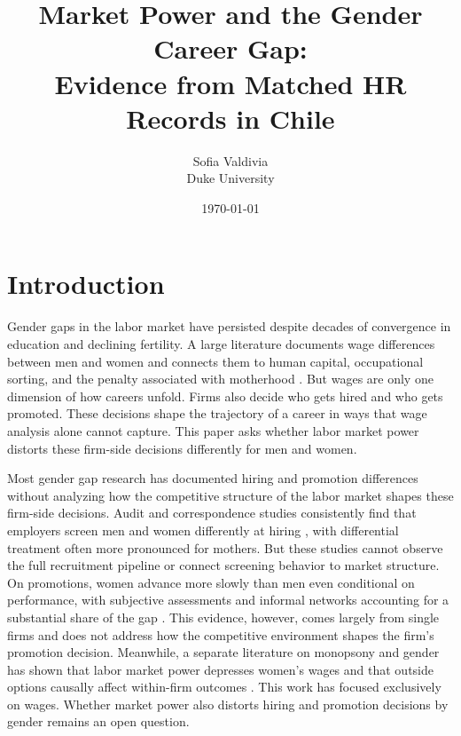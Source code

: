 \documentclass[11pt]{article}
\title{Market Power and the Gender Career Gap: \\ Evidence from Matched HR Records in Chile}
\author{Sofia Valdivia \\ Duke University}
\date{\today}
\begin{document}
\maketitle

\section{Introduction}

Gender gaps in the labor market have persisted despite decades of convergence in education and declining fertility. A large literature documents wage differences between men and women and connects them to human capital, occupational sorting, and the penalty associated with motherhood \citep{goldin_grand_2014, blau_gender_2017, kleven_children_2019}. But wages are only one dimension of how careers unfold. Firms also decide who gets hired and who gets promoted. These decisions shape the trajectory of a career in ways that wage analysis alone cannot capture. This paper asks whether labor market power distorts these firm-side decisions differently for men and women.

Most gender gap research has documented hiring and promotion differences without analyzing how the competitive structure of the labor market shapes these firm-side decisions. Audit and correspondence studies consistently find that employers screen men and women differently at hiring \citep{bertrand_are_2004, correll_getting_2007, kline_systemic_2022}, with differential treatment often more pronounced for mothers. But these studies cannot observe the full recruitment pipeline or connect screening behavior to market structure. On promotions, women advance more slowly than men even conditional on performance, with subjective assessments and informal networks accounting for a substantial share of the gap \citep{benson_potential_2026, cullen_old_boys, cassidy_promotion_2016}. This evidence, however, comes largely from single firms and does not address how the competitive environment shapes the firm's promotion decision. Meanwhile, a separate literature on monopsony and gender has shown that labor market power depresses women's wages \citep{webber_firm-level_2016, sharma_monopsony_2023, card_bargaining_2016} and that outside options causally affect within-firm outcomes \citep{caldwell_outside_nodate}. This work has focused exclusively on wages. Whether market power also distorts hiring and promotion decisions by gender remains an open question.
\end{document}
